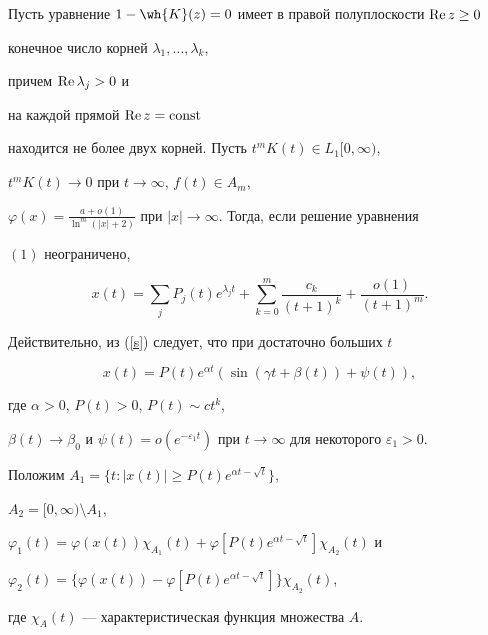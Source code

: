 \begin{thm}


Пусть уравнение $1-\wh{K}(z)=0$ имеет в правой полуплоскости $\operatorname{Re} z \ge 0$


конечное число корней $\lambda_1,\dotsc,\lambda_k$,


причем $\operatorname{Re}\lambda_j > 0$ и


на каждой прямой $\operatorname{Re} z=\operatorname{const}$


находится не более двух корней. Пусть $t^m K(t)\in L_1[0,\infty)$,


$t^m K(t)\to 0$ при $t\to\infty$, $f(t)\in A_m$,


$\varphi(x)=\frac{a+o(1)}{\ln^m


(|x|+2)}$ при $|x| \to \infty$. Тогда, если решение уравнения


$(1)$ неограничено,


\begin{equation}


x(t)= \sum_j P_j (t) e^{\lambda_j t} + \sum_{k=0}^m \frac{c_k}{(t+1)^k} +


\frac {o(1)}{(t+1)^m}. \label{x(t)}


\end{equation}


\end{thm}





Действительно, из (\ref{s}) следует, что при достаточно больших $t$


$$


x(t)=P(t)e^{\alpha t}(\sin(\gamma t+\beta(t))+\psi(t)),


$$


где $\alpha>0$, $P(t)>0$, $P(t)\sim ct^k$,


$\beta(t)\to\beta_0$ и $\psi(t)=o(e^{-


\varepsilon_1 t})$ при $t\to\infty$ для некоторого $\varepsilon_1>0$.


Положим $A_1=\{t:|x(t)|\ge P(t)e^{\alpha t-\sqrt{t}}\}$,


$A_2=[0,\infty)\setminus A_1$,


$\varphi_1(t)=\varphi(x(t))\chi_{A_1}(t)+\varphi[P(t)e^{


\alpha t-\sqrt{t}}]\chi_{A_2}(t)$ и


$\varphi_2(t)=\{\varphi(x(t))-\varphi[P(t)e^{\alpha t-\sqrt{t}}


]\}\chi_{A_2}(t)$,


где $\chi_A(t)$ --- характеристическая функция множества $A$.


